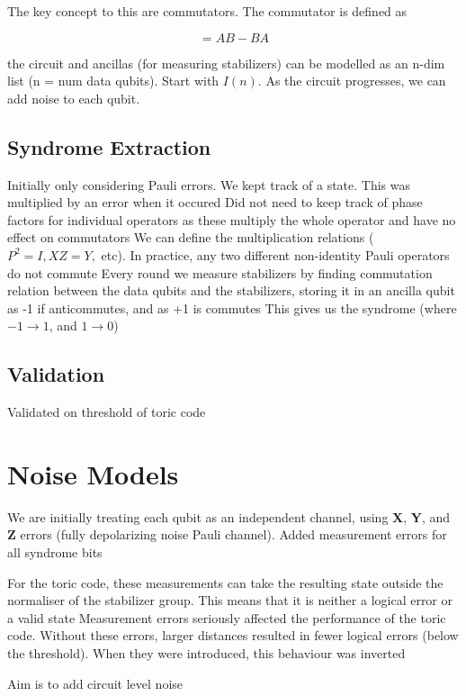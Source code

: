 \documentclass[a4paper,12pt]{article}
\begin{document}
The key concept to this are commutators. The commutator is defined as

\begin{equation}
    [A, B] = AB - BA
\end{equation}

the circuit and ancillas (for measuring stabilizers) can be modelled as an n-dim list (n = num data qubits).
Start with $I(n)$. As the circuit progresses, we can add noise to each qubit.

\subsection{Syndrome Extraction}
Initially only considering Pauli errors. We kept track of a state. This was multiplied by an error when it occured
Did not need to keep track of phase factors for individual operators as these multiply the whole operator and have no effect on commutators
We can define the multiplication relations ($P^2 = I, XZ = Y,$ etc). In practice, any two different non-identity Pauli operators do not commute
Every round we measure stabilizers by finding commutation relation between the data qubits and the stabilizers, storing it in an ancilla qubit as -1 if anticommutes, and as +1 is commutes
This gives us the syndrome (where $-1 \rightarrow 1$, and $1 \rightarrow 0$)

\subsection{Validation}
Validated on threshold of toric code


\section{Noise Models}

We are initially treating each qubit as an independent channel, using \textbf{X}, \textbf{Y}, and \textbf{Z} errors (fully depolarizing noise Pauli channel).
Added measurement errors for all syndrome bits

For the toric code, these measurements can take the resulting state outside the normaliser of the stabilizer group. This means that it is neither a logical error or a valid state
Measurement errors seriously affected the performance of the toric code. Without these errors, larger distances resulted in fewer logical errors (below the threshold). When they were introduced, this behaviour was inverted

Aim is to add circuit level noise
\end{document}
